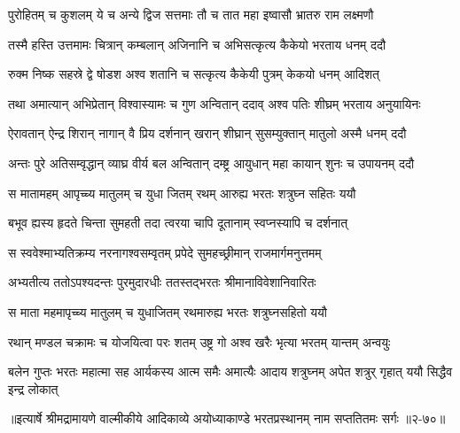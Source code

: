 \twolineshloka
{पुरोहितम् च कुशलम् ये च अन्ये द्विज सत्तमाः}
{तौ च तात महा इष्वासौ भ्रातरु राम लक्ष्मणौ} %

\twolineshloka
{तस्मै हस्ति उत्तमामः चित्रान् कम्बलान् अजिनानि च}
{अभिसत्कृत्य कैकेयो भरताय धनम् ददौ} %

\twolineshloka
{रुक्म निष्क सहस्रे द्वे षोडश अश्व शतानि च}
{सत्कृत्य कैकेयी पुत्रम् केकयो धनम् आदिशत्} %

\twolineshloka
{तथा अमात्यान् अभिप्रेतान् विश्वास्यामः च गुण अन्वितान्}
{ददाव् अश्व पतिः शीघ्रम् भरताय अनुयायिनः} %

\twolineshloka
{ऐरावतान् ऐन्द्र शिरान् नागान् वै प्रिय दर्शनान्}
{खरान् शीघ्रान् सुसम्युक्तान् मातुलो अस्मै धनम् ददौ} %

\twolineshloka
{अन्तः पुरे अतिसम्वृद्धान् व्याघ्र वीर्य बल अन्वितान्}
{दम्ष्ट्र आयुधान् महा कायान् शुनः च उपायनम् ददौ} %

\twolineshloka
{स मातामहम् आपृच्च्य मातुलम् च युधा जितम्}
{रथम् आरुह्य भरतः शत्रुघ्न सहितः ययौ} %

\twolineshloka
{बभूव ह्यस्य हृदते चिन्ता सुमहती तदा}
{त्वरया चापि दूतानाम् स्वप्नस्यापि च दर्शनात्} %

\twolineshloka
{स स्ववेश्माभ्यतिक्रम्य नरनागश्वसम्वृतम्}
{प्रपेदे सुमहच्छ्रीमान् राजमार्गमनुत्तमम्} %

\twolineshloka
{अभ्यतीत्य ततोऽपश्यदन्तः पुरमुदारधीः}
{ततस्तद्भरतः श्रीमानाविवेशानिवारितः} %

\twolineshloka
{स माता महमापृच्च्य मातुलम् च युधाजितम्}
{रथमारुह्य भरतः शत्रुघ्नसहितो ययौ} %

\twolineshloka
{रथान् मण्डल चक्रामः च योजयित्वा परः शतम्}
{उष्ट्र गो अश्व खरैः भृत्या भरतम् यान्तम् अन्वयुः} %

\fourlineindentedshloka
{बलेन गुप्तः भरतः महात्मा}
{सह आर्यकस्य आत्म समैः अमात्यैः}
{आदाय शत्रुघ्नम् अपेत शत्रुर्}
{गृहात् ययौ सिद्धैव इन्द्र लोकात्} %


॥इत्यार्षे श्रीमद्रामायणे वाल्मीकीये आदिकाव्ये अयोध्याकाण्डे भरतप्रस्थानम् नाम सप्ततितमः सर्गः ॥२-७०॥
